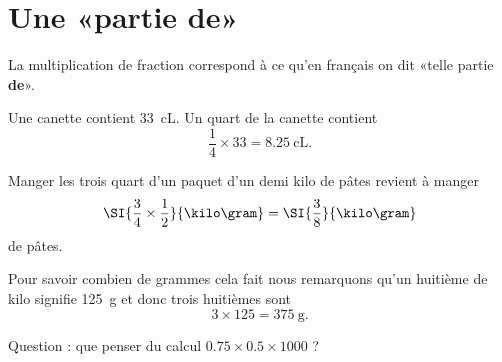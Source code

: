 \section{Une «partie de»}

\begin{Aretenir}
    La multiplication de fraction correspond à ce qu'en français on dit «telle partie {\bf de}».
\end{Aretenir}

\begin{example}
    Une canette contient \SI{33}{\centi\liter}. Un quart de la canette contient
    \begin{equation}
        \frac{1}{ 4 }\times 33 =\SI{8.25}{\centi\liter}.
    \end{equation}
\end{example}

\begin{example}
    Manger les trois quart d'un paquet d'un demi kilo de pâtes revient à manger
    \begin{equation}
        \SI{\frac{ 3 }{ 4 }\times \frac{1}{ 2 }}{\kilo\gram}=\SI{\frac{ 3 }{ 8 }}{\kilo\gram}
    \end{equation}
    de pâtes.

    Pour savoir combien de grammes cela fait nous remarquons qu'un huitième de kilo signifie \SI{125}{\gram} et donc trois huitièmes sont
    \begin{equation}
        3\times 125=\SI{375}{\gram}.
    \end{equation}

    Question : que penser du calcul \( 0.75\times 0.5\times 1000 \) ?
\end{example}
